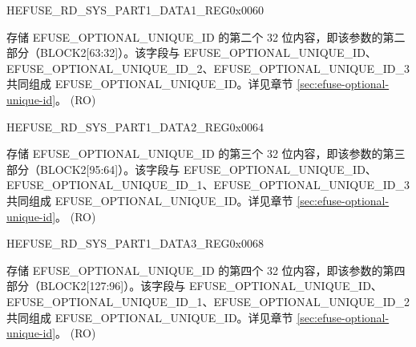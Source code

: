 \begin{register}{H}{EFUSE\_RD\_SYS\_PART1\_DATA1\_REG}{0x0060}\label{regdesc:EFUSERDSYSPART1DATA1REG}
%
\regnewline%
\begin{regdesc}\begin{reglist}
\label{fielddesc:EFUSEOPTIONALUNIQUEID1}\item [EFUSE\_OPTIONAL\_UNIQUE\_ID\_1] 存储 EFUSE\_OPTIONAL\_UNIQUE\_ID 的第二个 32 位内容，即该参数的第二部分（BLOCK2[63:32]）。该字段与 EFUSE\_OPTIONAL\_UNIQUE\_ID、EFUSE\_OPTIONAL\_UNIQUE\_ID\_2、EFUSE\_OPTIONAL\_UNIQUE\_ID\_3 共同组成 EFUSE\_OPTIONAL\_UNIQUE\_ID。详见章节 \ref{sec:efuse-optional-unique-id}。 (RO)
\end{reglist}\end{regdesc}
\end{register}


\begin{register}{H}{EFUSE\_RD\_SYS\_PART1\_DATA2\_REG}{0x0064}\label{regdesc:EFUSERDSYSPART1DATA2REG}
%
\regnewline%
\begin{regdesc}\begin{reglist}
\label{fielddesc:EFUSEOPTIONALUNIQUEID2}\item [EFUSE\_OPTIONAL\_UNIQUE\_ID\_2] 存储 EFUSE\_OPTIONAL\_UNIQUE\_ID 的第三个 32 位内容，即该参数的第三部分（BLOCK2[95:64]）。该字段与 EFUSE\_OPTIONAL\_UNIQUE\_ID、EFUSE\_OPTIONAL\_UNIQUE\_ID\_1、EFUSE\_OPTIONAL\_UNIQUE\_ID\_3 共同组成 EFUSE\_OPTIONAL\_UNIQUE\_ID。详见章节 \ref{sec:efuse-optional-unique-id}。 (RO)
\end{reglist}\end{regdesc}
\end{register}


\begin{register}{H}{EFUSE\_RD\_SYS\_PART1\_DATA3\_REG}{0x0068}\label{regdesc:EFUSERDSYSPART1DATA3REG}
%
\regnewline%
\begin{regdesc}\begin{reglist}
\label{fielddesc:EFUSEOPTIONALUNIQUEID3}\item [EFUSE\_OPTIONAL\_UNIQUE\_ID\_3] 存储 EFUSE\_OPTIONAL\_UNIQUE\_ID 的第四个 32 位内容，即该参数的第四部分（BLOCK2[127:96]）。该字段与 EFUSE\_OPTIONAL\_UNIQUE\_ID、EFUSE\_OPTIONAL\_UNIQUE\_ID\_1、EFUSE\_OPTIONAL\_UNIQUE\_ID\_2 共同组成 EFUSE\_OPTIONAL\_UNIQUE\_ID。详见章节 \ref{sec:efuse-optional-unique-id}。 (RO)
\end{reglist}\end{regdesc}
\end{register}



